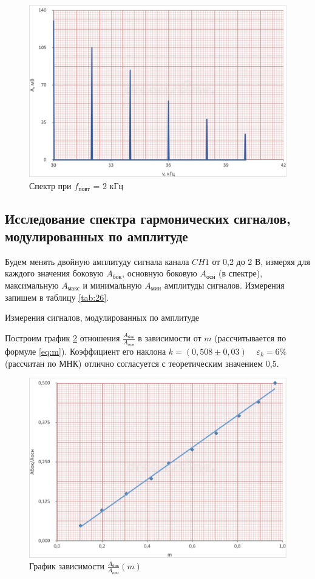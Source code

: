 \documentclass[12pt,a4paper]{article}
\begin{document}
\begin{figure}[H]
	\centering
	\includegraphics[width = 10 cm]{src/19_2.png}
	\caption{Спектр при $f_\text{повт}$ = 2 кГц}
	\label{fig:19_2}
\end{figure}

\subsection*{Исследование спектра гармонических сигналов, модулированных по амплитуде}

Будем менять двойную амплитуду сигнала канала $CH1$ от 0,2 до 2 В, измеряя для каждого значения боковую $A_\text{бок}$, основную боковую $A_\text{осн}$ (в спектре), максимальную $A_\text{макс}$ и минимальную $A_\text{мин}$ амплитуды сигналов. Измерения запишем в таблицу \ref{tab:26}.

\begin{table}[H]
    \caption{Измерения сигналов, модулированных по амплитуде}
    
	\label{tab:26}
\end{table}

Построим график \ref{fig:26} отношения $\frac{A_\text{бок}}{A_\text{осн}}$ в зависимости от $m$ (рассчитывается по формуле \ref{eq:m}).
Коэффициент его наклона $k = (0,508 \pm 0,03) \;\;\;\; \varepsilon_k = 6 \%$ (рассчитан по МНК) отлично согласуется с теоретическим значением 0,5.

\begin{figure}[H]
	\centering
	\includegraphics[width = 10 cm]{src/26.png}
	\caption{График зависимости $\frac{A_\text{бок}}{A_\text{осн}}(m)$}
	\label{fig:26}
\end{figure}
\end{document}
